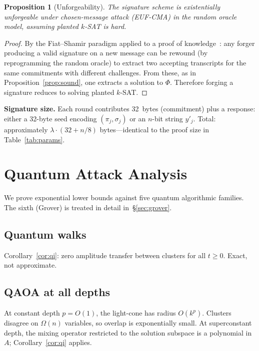 \documentclass[11pt]{article}
\newtheorem{proposition}[theorem]{Proposition}
\begin{document}
\begin{proposition}[Unforgeability]\label{prop:sig}
The signature scheme is existentially unforgeable under chosen-message attack (EUF-CMA) in the random oracle model, assuming planted $k$-SAT is hard.
\end{proposition}

\begin{proof}
By the Fiat--Shamir paradigm applied to a proof of knowledge~\cite{FS86,GMW91}: any forger producing a valid signature on a new message can be rewound (by reprogramming the random oracle) to extract two accepting transcripts for the same commitments with different challenges.  From these, as in Proposition~\ref{prop:sound}, one extracts a solution to $\Phi$.  Therefore forging a signature reduces to solving planted $k$-SAT.
\end{proof}

\noindent\textbf{Signature size.}  Each round contributes 32~bytes (commitment) plus a response: either a 32-byte seed encoding $(\pi_j, \sigma_j)$ or an $n$-bit string $y'_j$.  Total: approximately $\lambda \cdot (32 + n/8)$ bytes---identical to the proof size in Table~\ref{tab:params}.


\section{Quantum Attack Analysis}\label{sec:quantum}

We prove exponential lower bounds against five quantum algorithmic families.  The sixth (Grover) is treated in detail in~\S\ref{sec:grover}.


\subsection{Quantum walks}
Corollary~\ref{cor:qi}: zero amplitude transfer between clusters for all $t \geq 0$.  Exact, not approximate.


\subsection{QAOA at all depths}
At constant depth $p = O(1)$, the light-cone has radius $O(k^p)$.  Clusters disagree on $\Omega(n)$ variables, so overlap is exponentially small.  At superconstant depth, the mixing operator restricted to the solution subspace is a polynomial in $A$; Corollary~\ref{cor:qi} applies.
\end{document}
